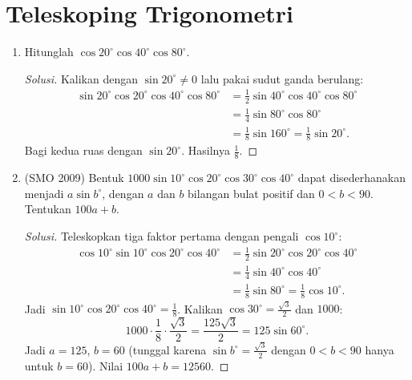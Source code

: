 \documentclass[12pt]{scrartcl}
\begin{document}
\section{Teleskoping Trigonometri}

\begin{enumerate}

	\item
	Hitunglah $\cos 20^{\circ}\cos 40^{\circ}\cos 80^{\circ}$.
	\begin{proof}[Solusi]
	Kalikan dengan $\sin 20^{\circ} \ne 0$ lalu pakai sudut ganda berulang:
	\begin{align*}
	\sin 20^{\circ}\cos 20^{\circ}\cos 40^{\circ}\cos 80^{\circ}
	&= \tfrac12\sin 40^{\circ}\cos 40^{\circ}\cos 80^{\circ} \\
	&= \tfrac14\sin 80^{\circ}\cos 80^{\circ} \\
	&= \tfrac18\sin 160^{\circ} = \tfrac18\sin 20^{\circ}.
	\end{align*}
	Bagi kedua ruas dengan $\sin 20^{\circ}$. Hasilnya $\frac18$.
	\end{proof}

	\item (SMO 2009)
	Bentuk $1000\sin 10^{\circ}\cos 20^{\circ}\cos 30^{\circ}\cos 40^{\circ}$
	dapat disederhanakan menjadi $a\sin b^{\circ}$, dengan $a$ dan $b$ bilangan
	bulat positif dan $0 < b < 90$. Tentukan $100a+b$.
	\begin{proof}[Solusi]
	Teleskopkan tiga faktor pertama dengan pengali $\cos 10^{\circ}$:
	\begin{align*}
	\cos 10^{\circ}\sin 10^{\circ}\cos 20^{\circ}\cos 40^{\circ}
	&= \tfrac12\sin 20^{\circ}\cos 20^{\circ}\cos 40^{\circ} \\
	&= \tfrac14\sin 40^{\circ}\cos 40^{\circ} \\
	&= \tfrac18\sin 80^{\circ} = \tfrac18\cos 10^{\circ}.
	\end{align*}
	Jadi $\sin 10^{\circ}\cos 20^{\circ}\cos 40^{\circ} = \frac18$.
	Kalikan $\cos 30^{\circ} = \frac{\sqrt{3}}{2}$ dan $1000$:
	\[ 1000 \cdot \frac18 \cdot \frac{\sqrt{3}}{2}
	= \frac{125\sqrt{3}}{2} = 125\sin 60^{\circ}. \]
	Jadi $a = 125$, $b = 60$ (tunggal karena $\sin b^{\circ} = \frac{\sqrt{3}}{2}$
	dengan $0 < b < 90$ hanya untuk $b = 60$).
	Nilai $100a+b = 12560$.
	\end{proof}


\end{enumerate}
\end{document}
